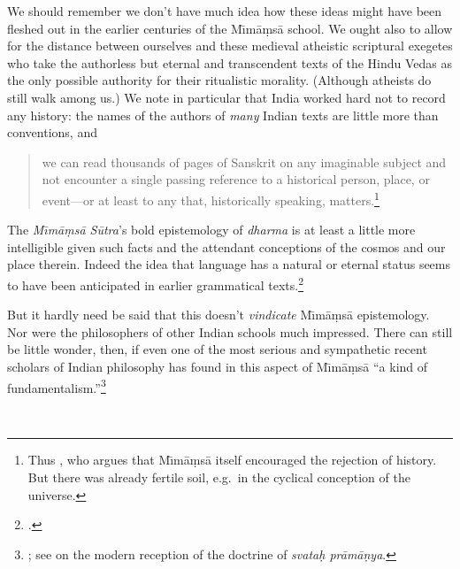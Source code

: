 ﻿\documentclass[11pt]{amsart}
\begin{document}
We should remember we don't have much idea how these ideas might have been fleshed out in the earlier centuries of the M\={\i}m\=a\d ms\=a school. We ought also to allow for the distance between ourselves and these medieval atheistic scriptural exegetes who take the authorless but eternal and transcendent texts of the Hindu Vedas as the only possible authority for their ritualistic morality. (Although atheists do still walk among us.) We note in particular that India worked hard not to record any history: the names of the authors of \emph{many} Indian texts are little more than conventions, and \small\begin{quote}we can read thousands of pages of Sanskrit on any imaginable subject and not encounter a single passing reference to a historical person, place, or event---or at least to any that, historically speaking, matters.\footnote{Thus \citet[p.~606]{pollock1989mima}, who argues that M\={\i}m\=a\d ms\=a itself encouraged the rejection of history. But there was already fertile soil, e.g.~in the cyclical conception of the universe.}\end{quote}\normalsize The \emph{M\={\i}m\=a\d ms\=a S\=utra}'s bold epistemology of \emph{dharma} is at least a little more intelligible given such facts and the attendant conceptions of the cosmos and our place therein. Indeed the idea that language has a natural or eternal status seems to have been anticipated in earlier grammatical texts.\footnote{\citet{tabereternality}.}

But it hardly need be said that this doesn't \emph{vindicate} M\={\i}m\=a\d ms\=a epistemology. Nor were the philosophers of other Indian schools much impressed. There can still be little wonder, then, if even one of the most serious and sympathetic recent scholars of Indian philosophy has found in this aspect of M\={\i}m\=a\d ms\=a ``a kind of  fundamentalism.''\footnote{\citet[p.~32]{matilal1986perception}; see \citet[pp.~589--91]{arnold2001ivr} on the modern reception of the doctrine of \emph{svata\d h pr\=am\=a\d nya}.}

\
\end{document}

